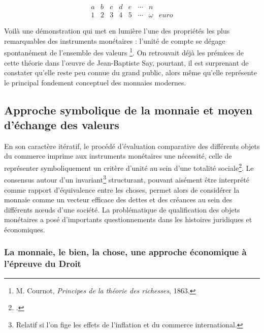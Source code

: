 { \[ \begin{matrix}
	a & b & c & d & e & \cdots & n \\
	1 & 2 & 3 & 4 & 5 &\cdots & \omega & euro
	\end{matrix} \]
	
Voilà une démonstration qui met en lumière l'une des propriétés les plus remarquables des instruments monétaires : l'unité de compte se dégage spontanément de l'ensemble des valeurs \footnote{M. Cournot, \emph{Principes de la théorie des richesses}, 1863.}. On retrouvait déjà les prémices de cette théorie dans l'\oe{}uvre de Jean-Baptiste Say, pourtant, il est surprenant de constater qu'elle reste peu connue du grand public, alors même qu'elle représente le principal fondement conceptuel des monnaies modernes.\par
 
 \subsection{Approche symbolique de la monnaie et moyen d'échange des valeurs}

En son caractère itératif, le procédé d'évaluation comparative des différents objets du commerce imprime aux instruments monétaires une nécessité, celle de représenter symboliquement un critère d'unité au sein d'une totalité sociale\footnote{.}. Le consensus autour d'un invariant\footnote{Relatif si l'on fige les effets de l'inflation et du commerce international.} structurant, pouvant aisément être interprété comme rapport d'équivalence entre les choses, permet alors de considérer la monnaie comme un vecteur efficace des dettes et des créances au sein des différents n\oe{}uds d'une société. La problématique de qualification des objets monétaires a posé d'importants questionnements dans les histoires juridiques et économiques.\par

\subsubsection{La monnaie, le bien, la chose, une approche économique à l'épreuve du Droit}

}
